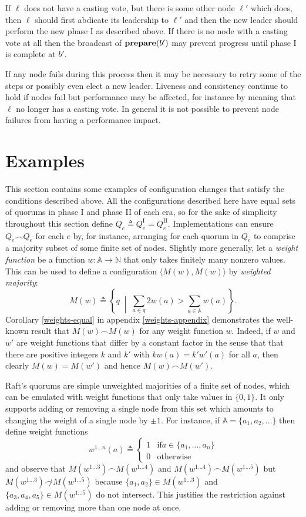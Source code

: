 \documentclass[journal]{IEEEtran}
\begin{document}
If $\ell$ does not have a casting vote, but there is some other node $\ell'$
which does, then $\ell$ should first abdicate its leadership to $\ell'$ and
then the new leader should perform the new phase I as described above. If there
is no node with a casting vote at all then the broadcast of $\mathbf{prepare}(b')$ may
prevent progress until phase I is complete at $b'$.

If any node fails during this process then it may be necessary to retry some of
the steps or possibly even elect a new leader. Liveness and consistency
continue to hold if nodes fail but performance may be affected, for instance by
meaning that $\ell$ no longer has a casting vote. In general it is not possible
to prevent node failures from having a performance impact.

\section{Examples}\label{examples}

This section contains some examples of configuration changes that satisfy the
conditions described above.  All the configurations described here have equal
sets of quorums in phase I and phase II of each era, so for the sake of
simplicity throughout this section define ${Q_e \triangleq Q^\textrm{I}_e =
Q^\textrm{II}_e}$.  Implementations can ensure $Q_e \frown Q_e$ for each $e$
by, for instance, arranging for each quorum in $Q_e$ to comprise a majority
subset of some finite set of nodes. Slightly more generally, let a
\textit{weight function} be a function $w : \mathbb A \to \mathbb N$ that only
takes finitely many nonzero values. This can be used to define a configuration
$\langle M(w), M(w) \rangle$ by \textit{weighted majority}: \[M(w) \triangleq
  \left\{ q \;\middle|\; \sum_{a \in q} 2 w(a) > \sum_{a \in \mathbb A} w(a)
\right\}.\] Corollary \ref{weights-equal} in appendix \ref{weights-appendix}
demonstrates the well-known result that $M(w) \frown M(w)$ for any weight
function $w$.  Indeed, if $w$ and $w'$ are weight functions that differ by a
constant factor in the sense that that there are positive integers $k$ and $k'$
with $k w(a) = k' w'(a)$ for all $a$, then clearly ${M(w) = M(w')}$ and hence
$M(w) \frown M(w')$.

\def\wl#1{w^{1 \ldots #1}}
\def\Mwl#1{M(\wl{#1})}

Raft's quorums are simple unweighted majorities of a finite set of nodes, which
can be emulated with weight functions that only take values in $\{0, 1\}$. It
only supports adding or removing a single node from this set which amounts to
changing the weight of a single node by $\pm 1$. For instance, if $\mathbb A =
\{ a_1, a_2, \ldots \}$ then define weight functions \[\wl{n}(a) \triangleq
\begin{cases} 1 & \mathrm{if } a \in \{a_1, \ldots, a_n\} \\ 0 &
\mathrm{otherwise}\end{cases}\] and observe that ${\Mwl{3} \frown \Mwl{4}}$ and
${\Mwl{4} \frown \Mwl{5}}$ but ${\Mwl{3} \not\frown \Mwl{5}}$ because $\{a_1,
a_2\} \in \Mwl{3}$ and $\{a_3, a_4, a_5\} \in \Mwl{5}$ do not intersect. This
justifies the restriction against adding or removing more than one node at
once.
\end{document}
